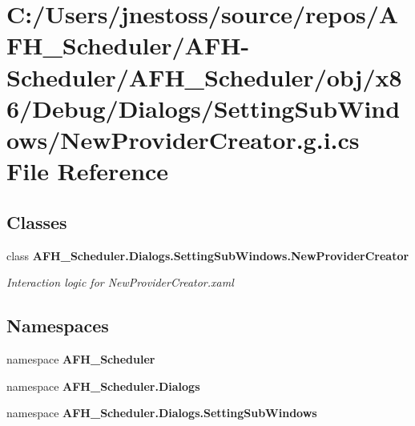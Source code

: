 \section{C\+:/\+Users/jnestoss/source/repos/\+A\+F\+H\+\_\+\+Scheduler/\+A\+F\+H-\/\+Scheduler/\+A\+F\+H\+\_\+\+Scheduler/obj/x86/\+Debug/\+Dialogs/\+Setting\+Sub\+Windows/\+New\+Provider\+Creator.g.\+i.\+cs File Reference}
\label{x86_2_debug_2_dialogs_2_setting_sub_windows_2_new_provider_creator_8g_8i_8cs}
\subsection*{Classes}
\begin{DoxyCompactItemize}
\item 
class \textbf{ A\+F\+H\+\_\+\+Scheduler.\+Dialogs.\+Setting\+Sub\+Windows.\+New\+Provider\+Creator}
\begin{DoxyCompactList}\small\item\em Interaction logic for New\+Provider\+Creator.\+xaml \end{DoxyCompactList}\end{DoxyCompactItemize}
\subsection*{Namespaces}
\begin{DoxyCompactItemize}
\item 
namespace \textbf{ A\+F\+H\+\_\+\+Scheduler}
\item 
namespace \textbf{ A\+F\+H\+\_\+\+Scheduler.\+Dialogs}
\item 
namespace \textbf{ A\+F\+H\+\_\+\+Scheduler.\+Dialogs.\+Setting\+Sub\+Windows}
\end{DoxyCompactItemize}
